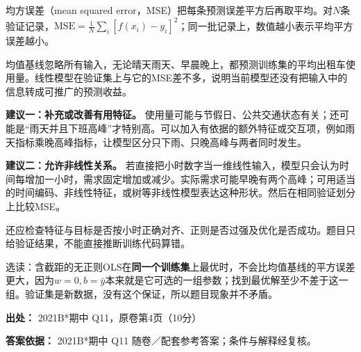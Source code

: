 均方误差（mean squared error，MSE）把每条预测误差平方后再取平均。对\(N\)条验证记录，\(\mathrm{MSE}=\frac1N\sum_i[f(x_i)-y_i]^2\)；同一批记录上，数值越小表示平均平方误差越小。


均值基线忽略所有输入，无论晴天雨天、早晨晚上，都预测训练集的平均出租车使用量。线性模型在验证集上与它的MSE差不多，说明当前模型还没有把输入中的信息转成可推广的预测收益。


\textbf{建议一：补充或改善有用特征。} 使用量可能与节假日、公共交通状态有关；还可能是“雨天并且下班高峰”才特别高。可以加入有依据的额外特征或交互项，例如雨天指标乘晚高峰指标，让模型区分只下雨、只晚高峰与两者同时发生。


\textbf{建议二：允许非线性关系。} 若直接把小时数字当一维线性输入，模型只会认为时间每增加一小时，需求固定增加或减少。实际需求可能早晚有两个高峰；可用适当的时间编码、非线性特征，或树等非线性模型表达这种形状。然后在相同验证划分上比较MSE。


还应检查特征与目标是否按小时正确对齐、正则是否过强及优化是否成功。题目只给验证结果，不能直接推断训练代码算错。


选读：含截距的无正则OLS在\textbf{同一个训练集}上最优时，不会比均值基线的平方误差更大，因为\(w=0,b=\bar y\)本来就是它可选的一组参数；找到最优解至少不差于这一组。验证集是新数据，没有这个保证，所以题目现象并不矛盾。


\textbf{出处：} 2021B*期中 Q11，原卷第4页（10分）


\textbf{答案依据：} 2021B*期中 Q11 随卷／配套参考答案；条件与解释经复核。

